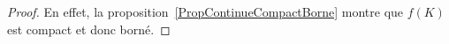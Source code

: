 \begin{proof}
	En effet, la proposition~\ref{PropContinueCompactBorne} montre que $f(K)$ est compact et donc borné.
\end{proof}



